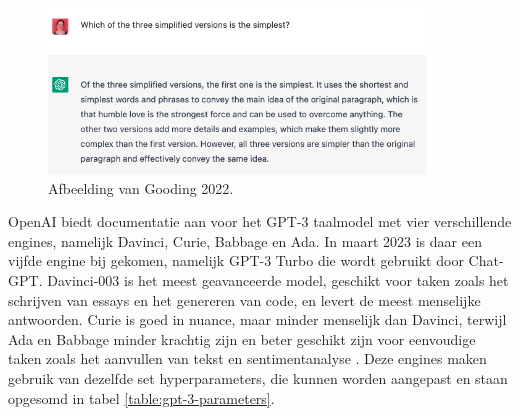 \begin{figure}[H]
	\includegraphics[width=10cm]{img/chatgpt-example-evaluation-gooding.png}
	\caption{Afbeelding van Gooding 2022.}
	\label{img:evaluation-gooding}
\end{figure}


\medspace

OpenAI biedt documentatie aan voor het GPT-3 taalmodel met vier verschillende engines, namelijk Davinci, Curie, Babbage en Ada. In maart 2023 is daar een vijfde engine bij gekomen, namelijk GPT-3 Turbo die wordt gebruikt door Chat-GPT. Davinci-003 is het meest geavanceerde model, geschikt voor taken zoals het schrijven van essays en het genereren van code, en levert de meest menselijke antwoorden. Curie is goed in nuance, maar minder menselijk dan Davinci, terwijl Ada en Babbage minder krachtig zijn en beter geschikt zijn voor eenvoudige taken zoals het aanvullen van tekst en sentimentanalyse \autocite{Brockman2023}. Deze engines maken gebruik van dezelfde set hyperparameters, die kunnen worden aangepast en staan opgesomd in tabel \ref{table:gpt-3-parameters}.

\medspace

